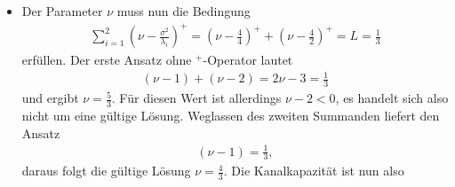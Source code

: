 \begin{itemize}
\begin{align*}
\matQ&=\matU\diag\left(\left(\nu-\frac{\sigma^2}{\lambda_i}\right)^+\right)\matU^* \\
&=\frac{1}{2}\left(\begin{array}{cc}
1 & 1 \\
i & -i \\
\end{array}\right)\left(\begin{array}{cc}
6 & 0 \\
0 & 5 \\
\end{array}\right)\left(\begin{array}{cc}
1 & -i \\
1 & i \\
\end{array}\right) \displaybreak[0] \\
&=\frac{1}{2}\left(\begin{array}{cc}
6 & 5 \\
6i & -5i \\
\end{array}\right)\left(\begin{array}{cc}
1 & -i \\
1 & i \\
\end{array}\right) \\
&=\frac{1}{2}\left(\begin{array}{cc} 
11 & -i \\
i & 11 \\
\end{array}\right).
\end{align*}
\item[d)] Der Parameter $\nu$ muss nun die Bedingung
\begin{align*}
\sum_{i=1}^2\left(\nu-\frac{\sigma^2}{\lambda_i}\right)^+=\left(\nu-\frac{4}{4}\right)^++\left(\nu-\frac{4}{2}\right)^+=L=\frac{1}{3}
\end{align*}
erfüllen. Der erste Ansatz ohne $^+$-Operator lautet
\begin{align*}
(\nu-1)+(\nu-2)=2\nu-3=\frac{1}{3}
\end{align*}
und ergibt $\nu=\frac{5}{3}$. Für diesen Wert ist allerdings $\nu-2<0$, es handelt sich also nicht um
eine gültige Lösung. Weglassen des zweiten Summanden liefert den Ansatz
\begin{align*}
(\nu-1)=\frac{1}{3},
\end{align*}
daraus folgt die gültige Lösung $\nu=\frac{4}{3}$. Die Kanalkapazität ist nun also

\end{itemize}
